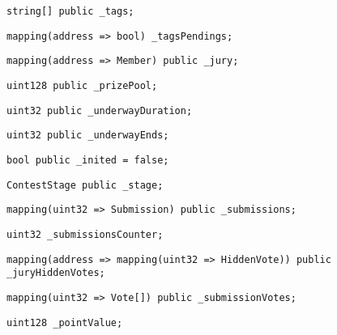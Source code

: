 \begin{lstlisting}[firstnumber=25]
    string[] public _tags;
\end{lstlisting}

\begin{lstlisting}[firstnumber=26]
    mapping(address => bool) _tagsPendings;
\end{lstlisting}

\begin{lstlisting}[firstnumber=27]
    mapping(address => Member) public _jury;
\end{lstlisting}

\begin{lstlisting}[firstnumber=30]
    uint128 public _prizePool;
\end{lstlisting}

\begin{lstlisting}[firstnumber=31]
    uint32 public _underwayDuration;
\end{lstlisting}

\begin{lstlisting}[firstnumber=32]
    uint32 public _underwayEnds;
\end{lstlisting}

\begin{lstlisting}[firstnumber=45]
    bool public _inited = false;
\end{lstlisting}

\begin{lstlisting}[firstnumber=104]
    ContestStage public _stage;
\end{lstlisting}

\begin{lstlisting}[firstnumber=118]
    mapping(uint32 => Submission) public _submissions;
\end{lstlisting}

\begin{lstlisting}[firstnumber=119]
    uint32 _submissionsCounter;
\end{lstlisting}

\begin{lstlisting}[firstnumber=132]
    mapping(address => mapping(uint32 => HiddenVote)) public _juryHiddenVotes;
\end{lstlisting}

\begin{lstlisting}[firstnumber=153]
    mapping(uint32 => Vote[]) public _submissionVotes;
\end{lstlisting}

\begin{lstlisting}[firstnumber=171]
    uint128 _pointValue;
\end{lstlisting}

